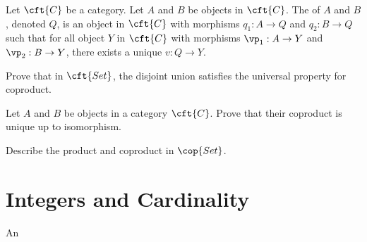 \documentclass[10pt]{article}
\begin{document}
\begin{definition}
    Let $\cft{C}$ be a category. Let $A$ and $B$ be objects in $\cft{C}$. The  of $A$ and $B$, denoted $Q$, is an object in $\cft{C}$ with morphisms ${q}_{1}:A\to Q$ and ${q}_{2}:B\to Q$ such that for all object $Y$ in $\cft{C}$ with morphisms ${\vp}_{1}:A\to Y$ and ${\vp}_{2}:B\to Y$, there exists a unique $v:Q\to Y$.
\end{definition}
\begin{problem}
    Prove that in $\cft{Set}$, the disjoint union satisfies the universal property for coproduct.
\end{problem}
\begin{problem}
    Let $A$ and $B$ be objects in a category $\cft{C}$. Prove that their coproduct is unique up to isomorphism.
\end{problem}
\begin{problem}
    Describe the product and coproduct in $\cop{Set}$. 
\end{problem}
\section{Integers and Cardinality}
\begin{definition}
    An  
\end{definition}



\newpage
\end{document}
